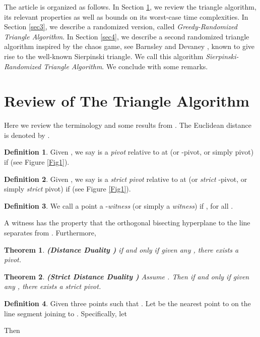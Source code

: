 \documentclass{article}
\newtheorem{thm}{Theorem}
\theoremstyle{definition}
\newtheorem{definition}{Definition}
\begin{document}
The article is organized as follows. In Section \ref{sec2}, we review the triangle algorithm, its relevant properties as well as bounds on its worst-case time complexities. In Section \ref{sec3}, we describe a randomized version, called {\it Greedy-Randomized Triangle Algorithm}. In Section \ref{sec4}, we describe a second randomized triangle algorithm inspired by the chaos game, see  Barnsley \cite{Barn93} and Devaney \cite{Devaney2004}, known to give rise to the well-known Sierpinski triangle.  We call this algorithm {\it Sierpinski-Randomized Triangle Algorithm}. We conclude with some remarks.

\section{Review of The Triangle Algorithm} \label{sec2}

Here we review the terminology and some results from \cite{kal14}. The Euclidean distance is denoted by .

\begin{definition} Given , we say  is a {\it pivot} relative to   at  (or -pivot, or simply pivot) if  (see Figure \ref{Fig1}).
\end{definition}

\begin{definition} Given , we say  is a {\it strict pivot} relative to  at  (or {\it strict} -pivot, or simply {\it strict} pivot) if  (see Figure \ref{Fig1}).
\end{definition}

\begin{definition} \label{defn4} We call a point  a -{\it witness} (or simply a {\it witness}) if , for all .
\end{definition}

A witness has the property that the orthogonal bisecting hyperplane to the line  separates  from . Furthermore,


\begin{thm} \label{thm1} {\bf (Distance Duality \cite{kal14})}  if and only if given any  , there exists a pivot.
\end{thm}

\begin{thm}  \label{thm2} {\bf (Strict Distance Duality \cite{kal14})} Assume .  Then  if and only if given any  , there exists a strict pivot.
\end{thm}

\begin{definition} Given three points  such that . Let  be the nearest point to  on the line segment joining   to . Specifically, let

Then

\end{definition}
\end{document}
